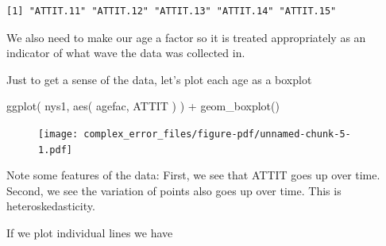 \documentclass[
  letterpaper,
  DIV=11,
  numbers=noendperiod]{scrreprt}
\newenvironment{Shaded}{\begin{snugshade}}{\end{snugshade}}
\newcommand{\AttributeTok}[1]{\textcolor[rgb]{0.49,0.56,0.16}{#1}}
\newcommand{\FloatTok}[1]{\textcolor[rgb]{0.25,0.63,0.44}{#1}}
\newcommand{\FunctionTok}[1]{\textcolor[rgb]{0.02,0.16,0.49}{#1}}
\newcommand{\NormalTok}[1]{\textcolor[rgb]{0.00,0.44,0.13}{#1}}
\newcommand{\OtherTok}[1]{\textcolor[rgb]{0.00,0.44,0.13}{#1}}
\newcommand{\SpecialCharTok}[1]{\textcolor[rgb]{0.25,0.44,0.63}{#1}}
\begin{document}
\begin{verbatim}
[1] "ATTIT.11" "ATTIT.12" "ATTIT.13" "ATTIT.14" "ATTIT.15"
\end{verbatim}

We also need to make our age a factor so it is treated appropriately as
an indicator of what wave the data was collected in.

\begin{Shaded}
\end{Shaded}

Just to get a sense of the data, let's plot each age as a boxplot

\begin{Shaded}
\begin{Highlighting}[]
\FunctionTok{ggplot}\NormalTok{( nys1, }\FunctionTok{aes}\NormalTok{( agefac, ATTIT ) ) }\SpecialCharTok{+}
  \FunctionTok{geom\_boxplot}\NormalTok{()}
\end{Highlighting}
\end{Shaded}

\begin{figure}[H]

{\centering \texttt{[image: complex\_error\_files/figure-pdf/unnamed-chunk-5-1.pdf]}

}

\end{figure}

Note some features of the data: First, we see that ATTIT goes up over
time. Second, we see the variation of points also goes up over time.
This is heteroskedasticity.

If we plot individual lines we have

\begin{Shaded}
\end{Shaded}
\end{document}
